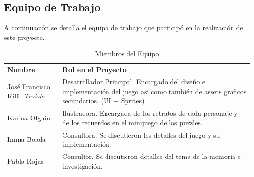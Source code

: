 \subsection{Equipo de Trabajo}\label{sec:equipo}
A continuación se detalla el equipo de trabajo que participó en la realización de este proyecto.

\begin{table}[h]
    \centering
    \begin{tabular}{|p{3.5cm}|p{11.5cm}|}
        \hline
        \rowcolor{Gray}
        \multicolumn{2}{|c|}{\textbf{Miembros del Equipo}} \\
        \hline
        \rowcolor{Gray}
        \textbf{Nombre} & \textbf{Rol en el Proyecto} \\
        \hline
        José Francisco Riffo \textit{Tesista} & Desarrollador Principal. Encargado del diseño e implementación del juego así como también de assets graficos secundarios. (UI + Sprites)\\
        \hline
        Karina Olguin & Ilustradora. Encargada de los retratos de cada personaje y de los recuerdos en el minijuego de los puzzles. \\
        \hline
        Imma Boada & Consultora. Se discutieron los detalles del juego y su implementación. \\
        \hline
        Pablo Rojas & Consultor. Se discutieron detalles del tema de la memoria e investigación. \\
        \hline
    \end{tabular}
    \caption{Miembros del Equipo}
    \label{tab:equipo}
\end{table}
